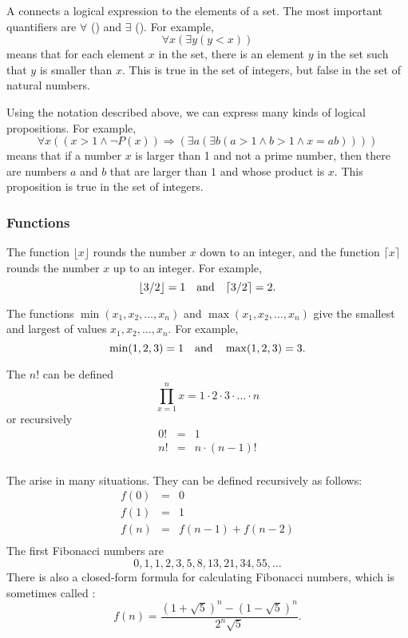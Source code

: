 
A  connects a logical expression
to the elements of a set.
The most important quantifiers are
$\forall$ () and $\exists$ ().
For example,
\[\forall x (\exists y (y < x))\]
means that for each element $x$ in the set,
there is an element $y$ in the set
such that $y$ is smaller than $x$.
This is true in the set of integers,
but false in the set of natural numbers.

Using the notation described above,
we can express many kinds of logical propositions.
For example,
\[\forall x ((x>1 \land \lnot P(x)) \Rightarrow (\exists a (\exists b (a > 1 \land b > 1 \land x = ab))))\]
means that if a number $x$ is larger than 1
and not a prime number,
then there are numbers $a$ and $b$
that are larger than $1$ and whose product is $x$.
This proposition is true in the set of integers.

\subsubsection{Functions}

The function $\lfloor x \rfloor$ rounds the number $x$
down to an integer, and the function
$\lceil x \rceil$ rounds the number $x$
up to an integer. For example,
\[ \lfloor 3/2 \rfloor = 1 \hspace{10px} \textrm{and} \hspace{10px} \lceil 3/2 \rceil = 2.\]

The functions $\min(x_1,x_2,\ldots,x_n)$
and $\max(x_1,x_2,\ldots,x_n)$
give the smallest and largest of values
$x_1,x_2,\ldots,x_n$.
For example,
\[ \min(1,2,3)=1 \hspace{10px} \textrm{and} \hspace{10px} \max(1,2,3)=3.\]


The  $n!$ can be defined
\[\prod_{x=1}^n x = 1 \cdot 2 \cdot 3 \cdot \ldots \cdot n\]
or recursively
\[
\begin{array}{lcl}
0! & = & 1 \\
n! & = & n \cdot (n-1)! \\
\end{array}
\]


The 
arise in many situations.
They can be defined recursively as follows:
\[
\begin{array}{lcl}
f(0) & = & 0 \\
f(1) & = & 1 \\
f(n) & = & f(n-1)+f(n-2) \\
\end{array}
\]
The first Fibonacci numbers are
\[0, 1, 1, 2, 3, 5, 8, 13, 21, 34, 55, \ldots\]
There is also a closed-form formula
for calculating Fibonacci numbers, which is sometimes called
 :
\[f(n)=\frac{(1 + \sqrt{5})^n - (1-\sqrt{5})^n}{2^n \sqrt{5}}.\]

